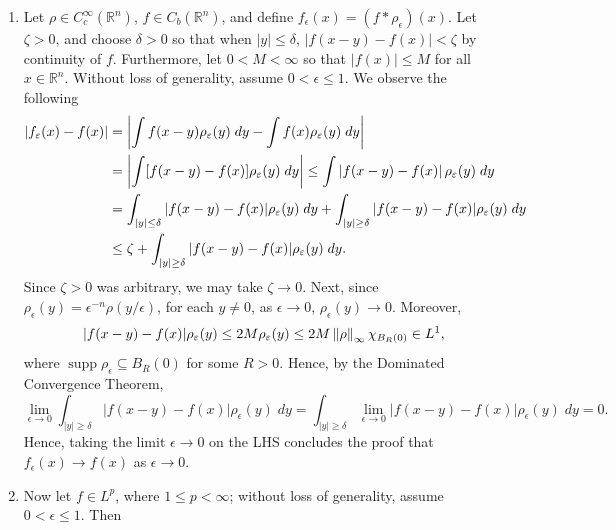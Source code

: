 \documentclass{article}
\begin{document}
\begin{itemize}
	\begin{solutions}
		\begin{enumerate}[itemsep =-2pt,label = (\arabic{*})]
			\item Let $\rho \in C_{c}^{\infty}(\mathbb{R}^{n})$, $f \in C_{b}(\mathbb{R}^{n})$, and define $f_{\epsilon}(x) = (f \ast \rho_{\epsilon})(x)$. Let $\zeta > 0$, and choose $\delta > 0$ so that when $|y| \leq \delta$, $|f(x - y) - f(x)| < \zeta$ by continuity of $f$. Furthermore, let $0 < M < \infty$ so that $|f(x)| \leq M$ for all $x \in \mathbb{R}^{n}$. Without loss of generality, assume $0 < \epsilon \leq 1$. We observe the following 
			\begin{align}
				\begin{split}
					\left| f_{\varepsilon}(x) - f(x) \right| &= \left| \int f(x - y)\rho_{\varepsilon}(y)\;dy - \int f(x) \rho_{\varepsilon}(y)\;dy \right| \\
					&= \left| \int [f(x - y) -f(x)]\rho_{\varepsilon}(y)\;dy \right| \leq \int \left| f(x - y)-f(x) \right|\rho_{\varepsilon}(y)\;dy \\
					&= \int_{|y| \leq \delta}|f(x - y) - f(x)|\rho_{\varepsilon}(y)\;dy + \int_{|y|\geq \delta}|f(x - y) - f(x)|\rho_{\varepsilon}(y)\;dy \\
					&\leq \zeta + \int_{|y|\geq \delta}|f(x - y) - f(x)|\rho_{\varepsilon}(y)\;dy.
				\end{split}
			\end{align}
			Since $\zeta > 0$ was arbitrary, we may take $\zeta \to 0$. Next, since $\rho_{\epsilon}(y) = \epsilon^{-n}\rho(y/\epsilon)$, for each $y \neq 0$, as $\epsilon \to 0$, $\rho_{\epsilon}(y) \to 0$. Moreover, 
			\begin{equation}
				|f(x - y) - f(x)|\rho_{\varepsilon}(y) \leq 2M\rho_{\varepsilon}(y) \leq 2M\left\Vert \rho \right\Vert_{\infty}\chi_{B_{R}(0)}\in L^{1}, 
			\end{equation}
			where $\operatorname{supp}{\rho_{\epsilon}} \subseteq B_{R}(0)$ for some $R > 0$. Hence, by the Dominated Convergence Theorem, 
				\begin{equation}
					\lim_{\epsilon \to 0}\int_{|y|\geq \delta} |f(x - y) - f(x)|\rho_{\epsilon}(y)\;dy = \int_{|y|\geq \delta}\lim_{\epsilon \to 0}|f(x - y) - f(x)|\rho_{\epsilon}(y)\;dy = 0. 
				\end{equation}
			Hence, taking the limit $\epsilon \to 0$ on the LHS concludes the proof that $f_{\epsilon}(x) \to f(x)$ as $\epsilon \to 0$. 
			\item Now let $f \in L^{p}$, where $1 \leq p < \infty$; without loss of generality, assume $0 < \epsilon \leq 1$. Then 

\end{enumerate}
\end{solutions}
\end{itemize}
\end{document}
